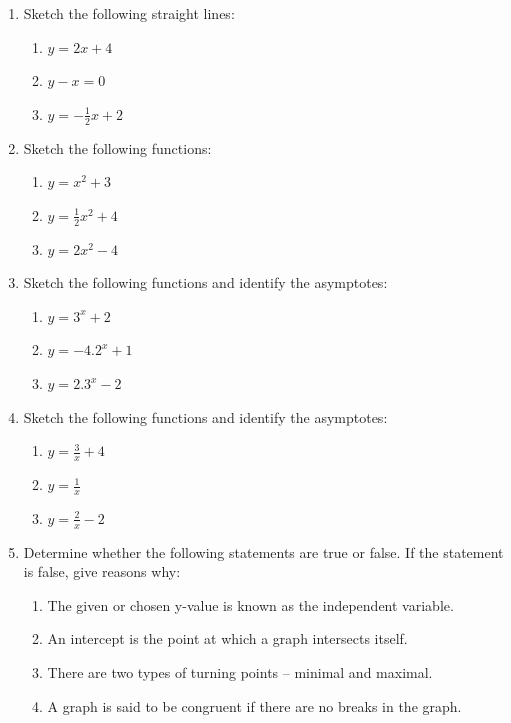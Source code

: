 \begin{enumerate}[noitemsep, label=\textbf{\arabic*}. ] 
\item Sketch the following straight lines: 
    \begin{enumerate}[noitemsep, label=\textbf{\alph*}. ] 
    \item $y=2x+4$ 
    \item $y-x=0$ 
    \item $y=-\frac{1}{2}x+2$
    \end{enumerate}
\item Sketch the following functions: 
    \begin{enumerate}[noitemsep, label=\textbf{\alph*}. ] 
    \item $y={x}^{2}+3$ 
    \item $y=\frac{1}{2}{x}^{2}+4$
    \item $y=2{x}^{2}-4$
    \end{enumerate}
\item Sketch the following functions and identify the asymptotes: 
    \begin{enumerate}[noitemsep, label=\textbf{\alph*}. ] 
    \item $y={3}^{x}+2$ 
    \item $y=-4.{2}^{x}+1$ 
    \item $y=2.{3}^{x}-2$ 
    \end{enumerate}
\item Sketch the following functions and identify the asymptotes: 
    \begin{enumerate}[noitemsep, label=\textbf{\alph*}. ] 
    \item $y=\frac{3}{x}+4$ 
    \item $y=\frac{1}{x}$ 
    \item $y=\frac{2}{x}-2$ 
    \end{enumerate}
\item Determine whether the following statements are true or false. If the statement is false, give reasons why:
    \begin{enumerate}[noitemsep, label=\textbf{\alph*}. ] 
    \item The given or chosen y-value is known as the independent variable.
    \item An intercept is the point at which a graph intersects itself.
    \item There are two types of turning points -- minimal and maximal.
    \item A graph is said to be congruent if there are no breaks in the graph.

\end{enumerate}
\end{enumerate}
